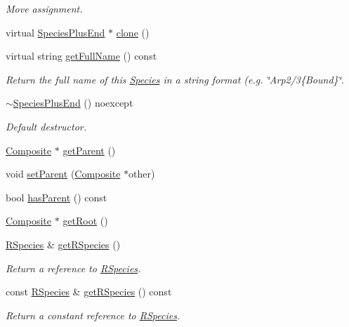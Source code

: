 \begin{DoxyCompactItemize}
\begin{DoxyCompactList}\small\item\em Move assignment. \end{DoxyCompactList}\item 
virtual \hyperlink{classSpeciesPlusEnd}{Species\+Plus\+End} $\ast$ \hyperlink{classSpeciesPlusEnd_a359b23c2ec95d9ead3f8f40d1bc641de}{clone} ()
\item 
virtual string \hyperlink{classSpeciesPlusEnd_aa010e7adb578155bf0142fa84684b47e}{get\+Full\+Name} () const 
\begin{DoxyCompactList}\small\item\em Return the full name of this \hyperlink{classSpecies}{Species} in a string format (e.\+g. \char`\"{}\+Arp2/3\{\+Bound\}\char`\"{}. \end{DoxyCompactList}\item 
\hyperlink{classSpeciesPlusEnd_ab1c15e965d105e1d11dcc8608796d789}{$\sim$\+Species\+Plus\+End} () noexcept
\begin{DoxyCompactList}\small\item\em Default destructor. \end{DoxyCompactList}\item 
\hyperlink{classComposite}{Composite} $\ast$ \hyperlink{classSpecies_af24cab7cbaa561d35b08fef5faf05fdf}{get\+Parent} ()
\item 
void \hyperlink{classSpecies_acc64c5b61abf911872d433ac32b62de8}{set\+Parent} (\hyperlink{classComposite}{Composite} $\ast$other)
\item 
bool \hyperlink{classSpecies_a40262d7217fcc28a31682aee40a19232}{has\+Parent} () const 
\item 
\hyperlink{classComposite}{Composite} $\ast$ \hyperlink{classSpecies_a876c8a827476a11e05f3b7a7669c29b6}{get\+Root} ()
\item 
\hyperlink{classRSpecies}{R\+Species} \& \hyperlink{classSpecies_a048dd7bc3fecd08b1b1797dc83aa163d}{get\+R\+Species} ()
\begin{DoxyCompactList}\small\item\em Return a reference to \hyperlink{classRSpecies}{R\+Species}. \end{DoxyCompactList}\item 
const \hyperlink{classRSpecies}{R\+Species} \& \hyperlink{classSpecies_aa1069a34b360f84d186f48bd99f80971}{get\+R\+Species} () const 
\begin{DoxyCompactList}\small\item\em Return a constant reference to \hyperlink{classRSpecies}{R\+Species}. \end{DoxyCompactList}\item 

\end{DoxyCompactItemize}
